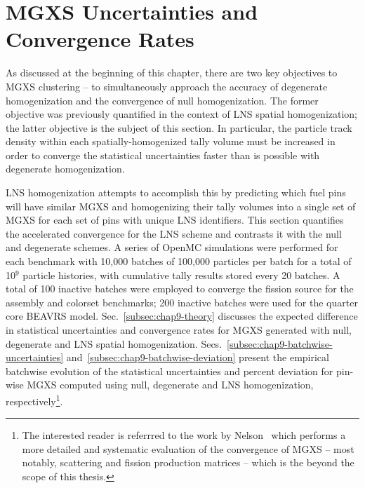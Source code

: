 \section{MGXS Uncertainties and Convergence Rates}
\label{sec:chap9-convergence}

As discussed at the beginning of this chapter, there are two key objectives to \ac{MGXS} clustering -- to simultaneously approach the accuracy of degenerate homogenization and the convergence of null homogenization. The former objective was previously quantified in the context of \ac{LNS} spatial homogenization; the latter objective is the subject of this section. In particular, the particle track density within each spatially-homogenized tally volume must be increased in order to converge the statistical uncertainties faster than is possible with degenerate homogenization.

\ac{LNS} homogenization attempts to accomplish this by predicting which fuel pins will have similar \ac{MGXS} and homogenizing their tally volumes into a single set of \ac{MGXS} for each set of pins with unique \ac{LNS} identifiers. This section quantifies the accelerated convergence for the \ac{LNS} scheme and contrasts it with the null and degenerate schemes. A series of OpenMC simulations were performed for each benchmark with 10,000 batches of 100,000 particles per batch for a total of 10$^{9}$ particle histories, with cumulative tally results stored every 20 batches. A total of 100 inactive batches were employed to converge the fission source for the assembly and colorset benchmarks; 200 inactive batches were used for the quarter core \ac{BEAVRS} model. Sec.~\ref{subsec:chap9-theory} discusses the expected difference in statistical uncertainties and convergence rates for \ac{MGXS} generated with null, degenerate and \ac{LNS} spatial homogenization. Secs.~\ref{subsec:chap9-batchwise-uncertainties} and~\ref{subsec:chap9-batchwise-deviation} present the empirical batchwise evolution of the statistical uncertainties and percent deviation for pin-wise \ac{MGXS} computed using null, degenerate and \ac{LNS} homogenization, respectively\footnote{The interested reader is referrred to the work by Nelson~\cite{nelson2014improved} which performs a more detailed and systematic evaluation of the convergence of \ac{MGXS} -- most notably, scattering and fission production matrices -- which is the beyond the scope of this thesis.}.

